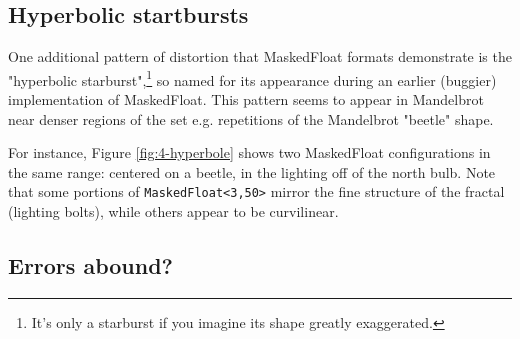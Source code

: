 \documentclass[sigconf,authorversion,nonacm]{acmart}
\begin{document}
\subsection{Hyperbolic startbursts}

One additional pattern of distortion that MaskedFloat formats demonstrate is the "hyperbolic starburst",\footnote{It's only a starburst if you imagine its shape greatly exaggerated.} so named for its appearance during an earlier (buggier)
implementation of MaskedFloat. This pattern seems to appear in Mandelbrot
near denser regions of the set e.g. repetitions of the Mandelbrot "beetle" shape.

For instance, Figure \ref{fig:4-hyperbole} shows two MaskedFloat configurations in the same range: centered on a beetle, in the lighting off of the north bulb. Note that some portions of \texttt{MaskedFloat<3,50>} mirror the fine structure of the fractal (lighting bolts), while others appear to be curvilinear.


\setcounter{subsection}{857421874}
\subsection{Errors abound?}

\end{document}
